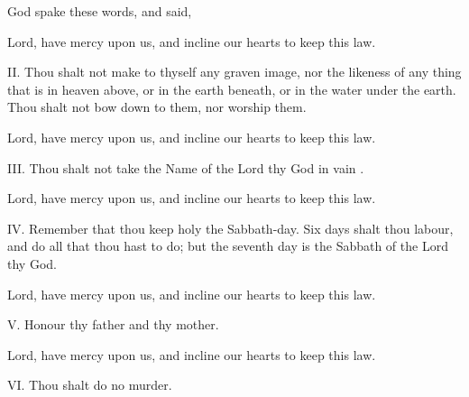 
\smallskip

\centerline{God spake these words, and said,}

\R Lord, have mercy upon us, and incline our hearts to keep this law.

II. Thou shalt not make to thyself any graven image, nor the likeness of any thing that is in heaven above, or in the earth beneath, or in the water under the earth. Thou shalt not bow down to them, nor worship them.%

\R Lord, have mercy upon us, and incline our hearts to keep this law.

III. Thou shalt not take the Name of the Lord thy God in vain%
.

\R Lord, have mercy upon us, and incline our hearts to keep this law.

IV. Remember that thou keep holy the Sabbath-day. Six days shalt thou labour, and do all that thou hast to do; but the seventh day is the Sabbath of the Lord thy God.%

\R Lord, have mercy upon us, and incline our hearts to keep this law.

V. Honour thy father and thy mother.%


\R Lord, have mercy upon us, and incline our hearts to keep this law.

VI. Thou shalt do no murder.


